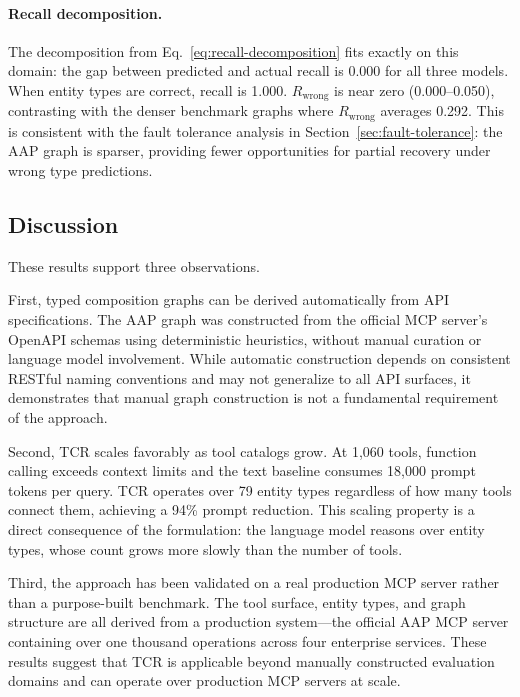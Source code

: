 \paragraph{Recall decomposition.}

The decomposition from Eq.~\ref{eq:recall-decomposition} fits exactly on this domain: the gap between predicted and actual recall is 0.000 for all three models.
When entity types are correct, recall is 1.000.
$R_{\text{wrong}}$ is near zero (0.000--0.050), contrasting with the denser benchmark graphs where $R_{\text{wrong}}$ averages 0.292.
This is consistent with the fault tolerance analysis in Section~\ref{sec:fault-tolerance}: the AAP graph is sparser, providing fewer opportunities for partial recovery under wrong type predictions.

\subsection{Discussion}
\label{sec:aap-discussion}

These results support three observations.

First, typed composition graphs can be derived automatically from API specifications.
The AAP graph was constructed from the official MCP server's OpenAPI schemas using deterministic heuristics, without manual curation or language model involvement.
While automatic construction depends on consistent RESTful naming conventions and may not generalize to all API surfaces, it demonstrates that manual graph construction is not a fundamental requirement of the approach.

Second, TCR scales favorably as tool catalogs grow.
At 1,060 tools, function calling exceeds context limits and the text baseline consumes 18,000 prompt tokens per query.
TCR operates over 79 entity types regardless of how many tools connect them, achieving a 94\% prompt reduction.
This scaling property is a direct consequence of the formulation: the language model reasons over entity types, whose count grows more slowly than the number of tools.

Third, the approach has been validated on a real production MCP server rather than a purpose-built benchmark.
The tool surface, entity types, and graph structure are all derived from a production system---the official AAP MCP server containing over one thousand operations across four enterprise services.
These results suggest that TCR is applicable beyond manually constructed evaluation domains and can operate over production MCP servers at scale.
